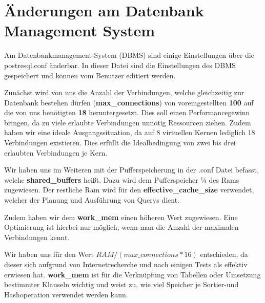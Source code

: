 \section{Änderungen am Datenbank Management System}

Am Datenbankmanagement-System (DBMS) sind einige Einstellungen über die
postresql.conf änderbar. In dieser Datei sind die Einstellungen des DBMS
gespeichert und können vom Benutzer editiert werden.

Zunächst wird von uns die Anzahl der Verbindungen, welche gleichzeitig zur
Datenbank bestehen dürfen (\textbf{max\_connections}) von voreingestellten
\textbf{100} auf die von uns benötigten \textbf{18} heruntergesetzt. 
Dies soll einen Performancegewinn bringen, da zu viele erlaubte Verbindungen
unnötig Ressourcen ziehen. Zudem haben wir eine ideale Ausgangssituation, da auf
8 virtuellen Kernen lediglich 18 Verbindungen existieren. Dies erfüllt die
Idealbedingung von zwei bis drei erlaubten Verbindungen je Kern.

Wir haben uns im Weiteren mit der Pufferspeicherung in der .conf Datei befasst,
welche \textbf{shared\_buffers} heißt. Dazu wird dem Pufferspeicher ¼ des Rams
zugewiesen. Der restliche Ram wird für den \textbf{effective\_cache\_size}
verwendet, welcher der Planung und Ausführung von Querys dient.

Zudem haben wir dem \textbf{work\_mem} einen höheren Wert zugewiesen. Eine
Optimierung ist hierbei nur möglich, wenn man die Anzahl der maximalen Verbindungen kennt.


Wir haben uns für den Wert $RAM/(max\_connections * 16)$ entschieden, da
dieser sich aufgrund von Internetrecherche und nach einigen Tests als effektiv
erwiesen hat. \textbf{work\_mem} ist für die Verknüpfung von Tabellen oder
Umsetzung bestimmter Klauseln wichtig und weist zu, wie viel Speicher je Sortier-und
Hashoperation verwendet werden kann.

\clearpage